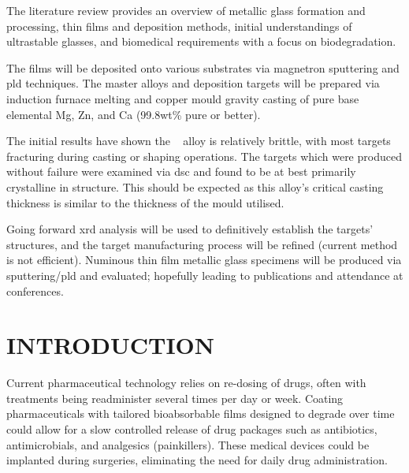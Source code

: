 \documentclass[draft,a4paper,12pt,oneside]{report}%
\begin{document}
The literature review provides an overview of metallic glass formation and processing, thin films and deposition methods, initial understandings of ultrastable glasses, and biomedical requirements with a focus on biodegradation. 

The films will be deposited onto various substrates via magnetron sputtering and \gls{pld} techniques. The master alloys and deposition targets will be prepared via induction furnace melting and copper mould gravity casting of pure base elemental Mg, Zn, and Ca (99.8wt\% pure or better).

The initial results have shown the \MgZnCa~ alloy is relatively brittle, with most targets fracturing during casting or shaping operations. The targets which were produced without failure were examined via \acrshort{dsc} and found to be at best primarily crystalline in structure. This should be expected as this alloy's critical casting thickness is similar to the thickness of the mould utilised. 

Going forward \acrshort{xrd} analysis will be used to definitively establish the targets' structures, and the target manufacturing process will be refined (current method is not efficient). Numinous thin film metallic glass specimens will be produced via sputtering/\gls{pld} and evaluated; hopefully leading to publications and attendance at conferences.

\chapter{INTRODUCTION}
\glsresetall
{}
Current pharmaceutical technology relies on re-dosing of drugs, often with treatments being readminister several times per day or week. Coating pharmaceuticals with tailored bioabsorbable films designed to degrade over time could allow for a slow controlled release of drug packages such as antibiotics, antimicrobials, and analgesics (painkillers). These medical devices could be implanted during surgeries, eliminating the need for daily drug administration.  
\end{document}
